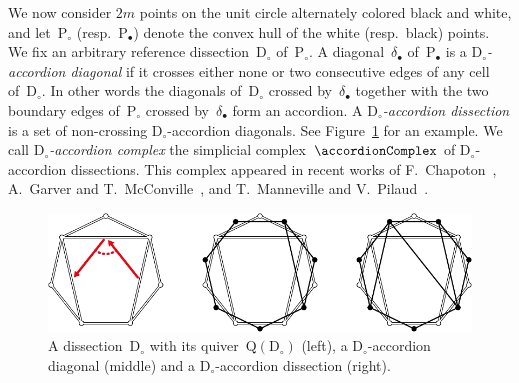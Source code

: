 \documentclass{amsart}
\theoremstyle{definition}
\newcommand{\fref}[1]{Figure~\ref{#1}} %
\newcommand{\darkblue}{\color{darkblue}} %
\newcommand{\defn}[1]{\textsl{\darkblue #1}} %
\newcommand{\polygon}{\mathrm{P}} %
\newcommand{\dissection}{\mathrm{D}} %
\newcommand{\sign}[3]{\varepsilon \big( {#1} \in {#2}\;|\;{#3} \big)} %
\newcommand{\SSS}{\reflectbox{$\mathsf{Z}$}} %
\newcommand{\ZZZ}{\mathsf{Z}} %
\newcommand{\VVV}{{\mathsf{{V \hspace{-.1686cm} I\,}}}} %
\newcommand{\quiver}{\mathrm{Q}} %
\begin{document}
We now consider $2m$ points on the unit circle alternately colored black and white, and let~$\polygon_\circ$ (resp.~$\polygon_\bullet$) denote the convex hull of the white (resp.~black) points.
We fix an arbitrary reference dissection~$\dissection_\circ$ of~$\polygon_\circ$.
A diagonal~$\delta_\bullet$ of~$\polygon_\bullet$ is a \defn{$\dissection_\circ$-accordion diagonal} if it crosses either none or two consecutive edges of any cell of~$\dissection_\circ$.
In other words the diagonals of~$\dissection_\circ$ crossed by~$\delta_\bullet$ together with the two boundary edges of~$\polygon_\circ$ crossed by~$\delta_\bullet$ form an accordion.
A \defn{$\dissection_\circ$-accordion dissection} is a set of non-crossing \mbox{$\dissection_\circ$-accordion} diagonals. 
See \fref{fig:exmAccordionDissections} for an example.
We call \defn{$\dissection_\circ$-accordion complex} the simplicial complex~$\accordionComplex$ of $\dissection_\circ$-accordion dissections.
This complex appeared in recent works of F.~Chapoton~\cite{Chapoton}, A.~Garver and T.~McConville~\cite{GarverMcConville}, and T.~Manneville and V.~Pilaud~\cite{MannevillePilaud-accordion}.

\begin{figure}
	\capstart
	\centerline{\includegraphics[width=\textwidth]{exmAccordionDissections}}
	\caption{A dissection~$\dissection_\circ$ with its quiver~$\quiver(\dissection_\circ)$ (left), a $\dissection_\circ$-accordion diagonal (middle) and a $\dissection_\circ$-accordion dissection (right).}
	\label{fig:exmAccordionDissections}
\end{figure}

\end{document}
